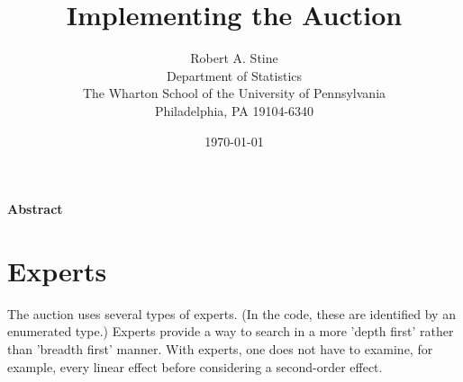 \documentclass[12pt]{article}
\title{  
         Implementing the Auction
}
\author{
        Robert A. Stine                                      \\
        Department of Statistics                             \\
        The Wharton School of the University of Pennsylvania \\
        Philadelphia, PA 19104-6340                          \\
}
\date{\today}
\begin{document}
\maketitle 

\vspace{-0.5in} \centerline{\bf Abstract} 

\clearpage

\section{Experts} %

 The auction uses several types of experts.  (In the code, these are identified
 by an enumerated type.)  Experts provide a way to search in a more 'depth
 first' rather than 'breadth first' manner.  With experts, one does not have to
 examine, for example, every linear effect before considering a second-order
 effect.
\end{document}
